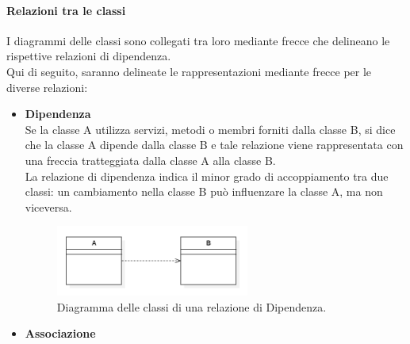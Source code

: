 \paragraph*{Relazioni tra le classi}
I diagrammi delle classi sono collegati tra loro mediante frecce che delineano le rispettive relazioni di dipendenza. \\
Qui di seguito, saranno delineate le rappresentazioni mediante frecce per le diverse relazioni: \\
\begin{itemize}
    \item \textbf{Dipendenza}\\
    Se la classe A utilizza servizi, metodi o membri forniti dalla classe B, si dice che la classe A dipende dalla classe B e tale relazione viene rappresentata con una freccia tratteggiata dalla classe A alla classe B. \\
    La relazione di dipendenza indica il minor grado di accoppiamento tra due classi: un cambiamento nella classe B può influenzare la classe A, ma non viceversa.
    \begin{figure}[H]
        \centering
        \includegraphics[width=0.6\textwidth]{../Images/NormeDiProgetto/ClassDiagram_Dipendenza.PNG}
        \caption{Diagramma delle classi di una relazione di Dipendenza.}
    \end{figure}
    \vspace{0.4cm}
    
    \item \textbf{Associazione}


\end{itemize}
